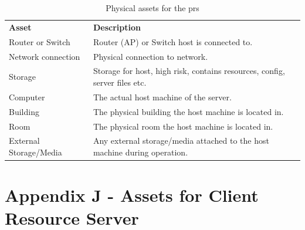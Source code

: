 \begin{appendices}
\begin{table}[htp]
  \begin{tabularx}{\linewidth}{lX}
    \textbf{Asset}          & \textbf{Description} \\
    Router or Switch        &	Router (AP) or Switch host is connected to. \\
    Network connection      &	Physical connection to network. \\
    Storage                 &	Storage for host, high risk, contains resources, config, server files etc. \\
    Computer                &	The actual host machine of the server. \\
    Building                &	The physical building the host machine is located in. \\
    Room                    &	The physical room the host machine is located in. \\
    External Storage/Media  &	Any external storage/media attached to the host machine during operation. \\
  \end{tabularx}
  \caption{Physical assets for the \acrfull{prs}}
  \label{tab:physical_assets_pr}
\end{table}

\section{Appendix J - Assets for Client Resource Server}
\label{appendix:crs_assets}


\end{appendices}
